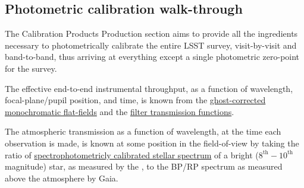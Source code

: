 









\subsection{Photometric calibration walk-through}
\label{sec:CPP:walkthrough}
The Calibration Products Production section aims to provide all the ingredients necessary to photometrically calibrate the entire LSST survey, visit-by-visit and band-to-band, thus arriving at everything except a single photometric zero-point for the survey.

The effective end-to-end instrumental throughput, as a function of wavelength, focal-plane/pupil position, and time, is known from the \hyperref[sec:CPP:output:monoPhotoFlat]{ghost-corrected monochromatic flat-fields} and the \hyperref[sec:CPP:output:filterTransmission]{filter transmission functions}.

The atmospheric transmission as a function of wavelength, at the time each observation is made, is known at some position in the field-of-view by taking the ratio of \hyperref[sec:CPP:output:spectrophotometricStandards]{spectrophotometricly calibrated stellar spectrum} of a bright ($8^{\text{th}}-10^{\text{th}}$ magnitude) star, as measured by the \auxtelescope, to the BP/RP spectrum as measured above the atmosphere by Gaia.


